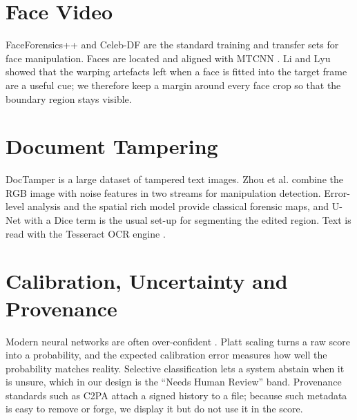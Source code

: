 \section{Face Video}
FaceForensics++ \cite{rossler} and Celeb-DF \cite{celebdf} are the standard training and transfer sets for face manipulation. Faces are located and aligned with MTCNN \cite{mtcnn}. Li and Lyu \cite{li} showed that the warping artefacts left when a face is fitted into the target frame are a useful cue; we therefore keep a margin around every face crop so that the boundary region stays visible.

\section{Document Tampering}
DocTamper \cite{doctamper} is a large dataset of tampered text images. Zhou et al. \cite{zhou} combine the RGB image with noise features in two streams for manipulation detection. Error-level analysis \cite{krawetz} and the spatial rich model \cite{fridrich} provide classical forensic maps, and U-Net \cite{unet} with a Dice term \cite{vnet} is the usual set-up for segmenting the edited region. Text is read with the Tesseract OCR engine \cite{tesseract}.

\section{Calibration, Uncertainty and Provenance}
Modern neural networks are often over-confident \cite{guo}. Platt scaling \cite{platt} turns a raw score into a probability, and the expected calibration error \cite{naeini} measures how well the probability matches reality. Selective classification \cite{geifman} lets a system abstain when it is unsure, which in our design is the ``Needs Human Review'' band. Provenance standards such as C2PA \cite{c2pa} attach a signed history to a file; because such metadata is easy to remove or forge, we display it but do not use it in the score.

